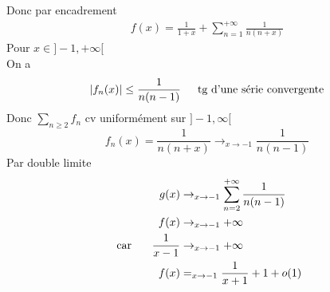 \documentclass{article}
\begin{document}
Donc  par encadrement\\
\begin{align*}
    f(x) = \frac{1}{1+x} + \sum_{n=1}^{+\infty} \frac{1}{n(n+x)}
\end{align*}
Pour \(x \in ]-1, +\infty[\)\\
On a \begin{align*}
    |f_n(x)| \leq \frac{1}{n(n-1)} \indent \text{tg d'une série convergente}
\end{align*}
Donc \(\sum_{n\geq2}^{} f_n\) cv uniformément sur \(]-1,\infty[\)\\
\begin{equation*}
    f_n(x) = \frac{1}{n(n+x)} \rightarrow_{x \to -1} \frac{1}{n(n-1)}
\end{equation*}
Par double limite \begin{align*}
    g(x) &\rightarrow_{x\to -1 } \sum_{n=2}^{+\infty}\frac{1}{n(n-1)}\\
    f(x) &\rightarrow_{x \to -1} +\infty\\
    \text{ car } \indent \frac{1}{x-1} &\rightarrow_{x \to -1} +\infty\\
    f(x) &=_{x\to -1} \frac{1}{x+1} + 1 + o(1)
\end{align*}
\end{document}
